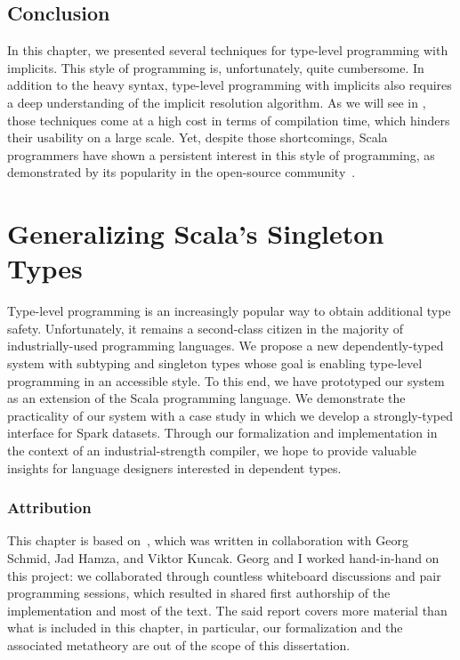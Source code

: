 \section{Conclusion}

In this chapter, we presented several techniques for type-level programming with implicits.
This style of programming is, unfortunately, quite cumbersome.
In addition to the heavy syntax, type-level programming with implicits also requires a deep understanding of the implicit resolution algorithm.
As we will see in , those techniques come at a high cost in terms of compilation time, which hinders their usability on a large scale.
Yet, despite those shortcomings, Scala programmers have shown a persistent interest in this style of programming, as demonstrated by its popularity in the open-source community~\citep{sabin2011shapeless, pilquist2013scodecs, blanvillain2016frameless}.

\chapter{Generalizing Scala's Singleton Types}
\label{chap:generalizing-singleton-types}

Type-level programming is an increasingly popular way to obtain additional type safety.
Unfortunately, it remains a second-class citizen in the majority of industrially-used programming languages.
We propose a new dependently-typed system with subtyping and singleton types whose goal is enabling type-level programming in an accessible style.
To this end, we have prototyped our system as an extension of the Scala programming language.
We demonstrate the practicality of our system with a case study in which we develop a strongly-typed interface for Spark datasets.
Through our formalization and implementation in the context of an industrial-strength compiler, we hope to provide valuable insights for language designers interested in dependent types.

\subsection*{Attribution}

This chapter is based on~\citep{schmid2020coming}, which was written in collaboration with Georg Schmid, Jad Hamza, and Viktor Kuncak.
Georg and I worked hand-in-hand on this project: we collaborated through countless whiteboard discussions and pair programming sessions, which resulted in shared first authorship of the implementation and most of the text.
The said report covers more material than what is included in this chapter, in particular, our formalization and the associated metatheory are out of the scope of this dissertation.


